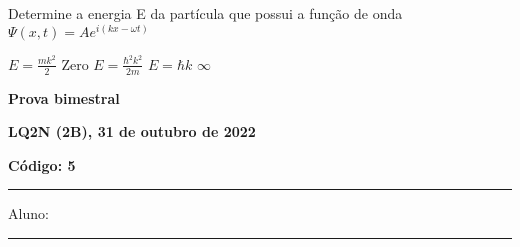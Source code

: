 \documentclass[12pt, addpoints]{exam}
\begin{document}
        \begin{questions}
\begin{multicols*}{2}
\question[20] Determine a energia E da partícula que possui a função de onda $\Psi(x,t)=Ae^{i(kx-\omega t)}$

\begin{choices}
\choice $E = \frac{mk^2}{2}$ \choice Zero \choice $E=\frac{\hbar^2k^2}{2m}$ \choice $E=\hbar k$ \choice $\infty$ \end{choices}
\end{multicols*}
\end{questions}
\newpage
        \begin{minipage}[b]{0.75\linewidth}
            \begin{flushleft}
                {\bf \large Prova bimestral}
            \end{flushleft}
            \begin{flushleft}
                {\bf \large LQ2N (2B), 31 de outubro de 2022}
            \end{flushleft}
        \end{minipage}
        \begin{minipage}[b]{0.20\linewidth}
            \begin{flushright}
                {\bf \large Código: 5}
            \end{flushright}
        \end{minipage}
        \vspace{0.5cm} \hrule \vspace{0.5cm}
        \begin{minipage}{0.75\linewidth}
            Aluno:
        \end{minipage}
        \vspace{0.5cm} \hrule \vspace{0.5cm}
\end{document}
